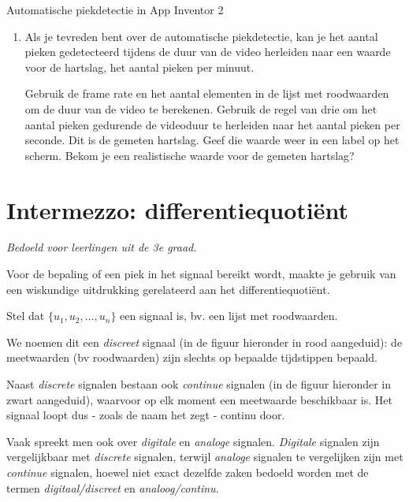 \begin{opdracht}{Automatische piekdetectie in App Inventor 2}
\begin{enumerate}
	\begin{opmerking}
	We spreken hier over een \emph{aanvaardbaar} resultaat en niet over een \emph{correct} resultaat. Het is goed mogelijk dat het aantal pieken dat je code detecteert licht afwijkt van het aantal pieken dat jij telt. Hoe sterk de afwijking is, hangt af van de kwaliteit van de opgenomen video. In Module 3 Sectie \ref{sec:Mod3_Sec3} gingen jullie al na welke factoren invloed hebben op de kwaliteit van de video.
	\end{opmerking}

	\item Als je tevreden bent over de automatische piekdetectie, kan je het aantal pieken gedetecteerd tijdens de duur van de video herleiden naar een waarde voor de hartslag, het aantal pieken per minuut.
	
	Gebruik de frame rate en het aantal elementen in de lijst met roodwaarden om de duur van de video te berekenen. Gebruik de regel van drie om het aantal pieken gedurende de videoduur te herleiden naar het aantal pieken per seconde. Dit is de gemeten hartslag. Geef die waarde weer in een label op het scherm. Bekom je een realistische waarde voor de gemeten hartslag?
\end{enumerate}
\end{opdracht}

\section{Intermezzo: differentiequoti\"ent}
\label{sec:Mod4_Sec2}
%
\emph{Bedoeld voor leerlingen uit de 3e graad.}

Voor de bepaling of een piek in het signaal bereikt wordt, maakte je gebruik van een wiskundige uitdrukking gerelateerd aan het differentiequoti\"ent.

Stel dat $\{ u_1, u_2, \ldots, u_n\}$ een signaal is, bv. een lijst met roodwaarden. 

\begin{opmerking}
	We noemen dit een \emph{discreet} signaal (in de figuur hieronder in rood aangeduid): de meetwaarden (bv roodwaarden) zijn slechts op bepaalde tijdstippen bepaald. 
	
	Naast \emph{discrete} signalen bestaan ook \emph{continue} signalen (in de figuur hieronder in zwart aangeduid), waarvoor op elk moment een meetwaarde beschikbaar is. Het signaal loopt dus - zoals de naam het zegt - continu door.
	
	
	Vaak spreekt men ook over \emph{digitale} en \emph{analoge} signalen. \emph{Digitale} signalen zijn vergelijkbaar met \emph{discrete} signalen, terwijl \emph{analoge} signalen te vergelijken zijn met \emph{continue} signalen, hoewel niet exact dezelfde zaken bedoeld worden met de termen \emph{digitaal/discreet} en \emph{analoog/continu}.

\end{opmerking}


